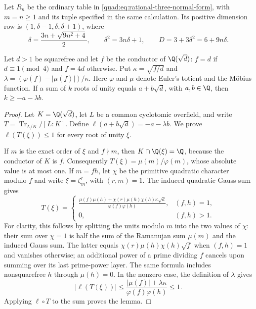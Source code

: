 Let $R_n$ be the ordinary table in
\eqref{quad:eq:rational-three-normal-form}, with $m=n\ge1$ and
its tuple specified in the same calculation. Its positive dimension
row is $(1,\delta-1,\delta,\delta+1)$, where
\[
 \delta=\frac{3n+\sqrt{9n^2+4}}2,
 \qquad \delta^2=3n\delta+1,\qquad D=3+3\delta^2=6+9n\delta.
\]

\begin{lemma}\label{finite:lem:odd-quadratic-length}
Let $d>1$ be squarefree and let $f$ be the conductor of $\Q(\sqrt d)$:
$f=d$ if $d\equiv1\pmod4$ and $f=4d$ otherwise. Put
$\kappa=\sqrt{f/d}$ and $\lambda=(\varphi(f)-|\mu(f)|)/\kappa$.
Here $\varphi$ and $\mu$ denote Euler's totient and the M\"obius function.
If a sum of $k$ roots of unity equals $a+b\sqrt d$, with
$a,b\in\Q$, then $k\geq-a-\lambda b$.
\end{lemma}
\begin{proof}
Let $K=\Q(\sqrt d)$, let $L$ be a common cyclotomic overfield, and
write $T=\operatorname{Tr}_{L/K}/[L:K]$. Define
$\ell(a+b\sqrt d)=-a-\lambda b$. We prove $\ell(T(\xi))\leq1$
for every root of unity $\xi$.

If $m$ is the exact order of $\xi$ and $f\nmid m$, then
$K\cap\Q(\xi)=\Q$, because the conductor of $K$ is $f$.
Consequently $T(\xi)=\mu(m)/\varphi(m)$, whose absolute value is at most one.
If $m=fh$, let $\chi$ be the primitive quadratic character modulo $f$ and
write $\xi=\zeta_m^r$, with $(r,m)=1$. The induced quadratic Gauss sum gives
\[
 T(\xi)=
 \begin{cases}
 \displaystyle\frac{\mu(f)\mu(h)+\chi(r)\mu(h)\chi(h)\kappa\sqrt d}
                      {\varphi(f)\varphi(h)},&(f,h)=1,\\[6pt]
 0,&(f,h)>1.
 \end{cases}
\]
For clarity, this follows by splitting the units modulo $m$ into the two
values of $\chi$: their sum over $\chi=1$ is half the sum of the Ramanujan
sum $\mu(m)$ and the induced Gauss sum. The latter equals
$\chi(r)\mu(h)\chi(h)\sqrt f$ when $(f,h)=1$ and vanishes otherwise;
an additional power of a prime dividing $f$ cancels upon summing over its
last prime-power layer. The same formula includes nonsquarefree $h$ through
$\mu(h)=0$.
In the nonzero case, the definition of $\lambda$ gives
\[
 |\ell(T(\xi))|
 \leq\frac{|\mu(f)|+\lambda\kappa}{\varphi(f)\varphi(h)}\leq1.
\]
Applying $\ell\circ T$ to the sum proves the lemma.
\end{proof}

